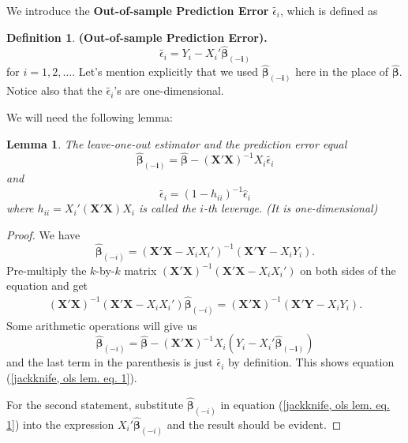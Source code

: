 \documentclass[11pt,a4paper]{amsart}
\theoremstyle{plain}
\newtheorem{lemma}{Lemma}
\theoremstyle{definition}
\newtheorem{definition}{Definition}
\begin{document}
	We introduce the \textbf{Out-of-sample Prediction Error} $\tilde{\epsilon_{i}}$, which is defined as 
	\begin{definition}
		\textbf{(Out-of-sample Prediction Error).} 
		\[	\tilde{\epsilon_{i}} = Y_{i} - X_{i}'\bm{\hat{\beta}_{(-i)}}	\]
		for $i = 1,2, \dots$. Let's mention explicitly that we used $\bm{\hat{\beta}_{(-i)}}$ here in the place of $\bm{\hat{\beta}}$. Notice also that the $\tilde{\epsilon_{i}}$'s are one-dimensional. 
	\end{definition}

	We will need the following lemma:
	\begin{lemma}\label{jackknife, ols lem.}
		The leave-one-out estimator and the prediction error equal
		\begin{equation}\label{jackknife, ols lem. eq. 1}
				\bm{\hat{\beta}_{(-i)}} = \bm{\hat{\beta}} - (\bm{X}'\bm{X})^{-1}X_{i}\tilde{\epsilon_{i}}
		\end{equation}
		and
		\begin{equation}\label{jackknife, ols lem. eq. 2}
		\tilde{\epsilon_{i}} = (1-h_{ii})^{-1}\hat{\epsilon}_{i}
		\end{equation}
		where $h_{ii} = X_{i}' (\bm{X}'\bm{X})X_{i}$ is called the $i$-th leverage. (It is one-dimensional)
	\end{lemma}
	\begin{proof}
		We have 
			\[		\hat{\bm{\beta}}_{(-i)}  = \left(\bm{X}'\bm{X} - X_{i}X_{i}'\right)^{-1}\left(\bm{X}'\bm{Y}- X_{i}Y_{i}\right).	\]
			Pre-multiply the $k$-by-$k$ matrix  $(\bm{X}'\bm{X})^{-1}(\bm{X}'\bm{X} - X_{i}X_{i}') $ on both sides of the equation and get
			\[	\begin{aligned}
			(\bm{X}'\bm{X})^{-1}(\bm{X}'\bm{X} - X_{i}X_{i}') 	\hat{\bm{\beta}}_{(-i)}  = 	(\bm{X}'\bm{X})^{-1}\left(\bm{X}'\bm{Y}- X_{i}Y_{i}\right).
			\end{aligned}	\]
			Some arithmetic operations will give us 
			\[	\bm{\hat{\beta}}_{(-i)} = \bm{\hat{\beta}} - (\bm{X}'\bm{X})^{-1}X_{i}\left(Y_{i} - X_{i}'\bm{\hat{\beta}_{(-i)}}\right) 	\] 
			and the last term in the parenthesis is just $	\tilde{\epsilon_{i}} $ by definition. This shows equation (\ref{jackknife, ols lem. eq. 1}). \par 
			For the second statement, substitute $	\hat{\bm{\beta}}_{(-i)} $ in equation (\ref{jackknife, ols lem. eq. 1}) into the expression $X_{i}' 	\hat{\bm{\beta}}_{(-i)} $ and the result should be evident.
	\end{proof}
\end{document}
